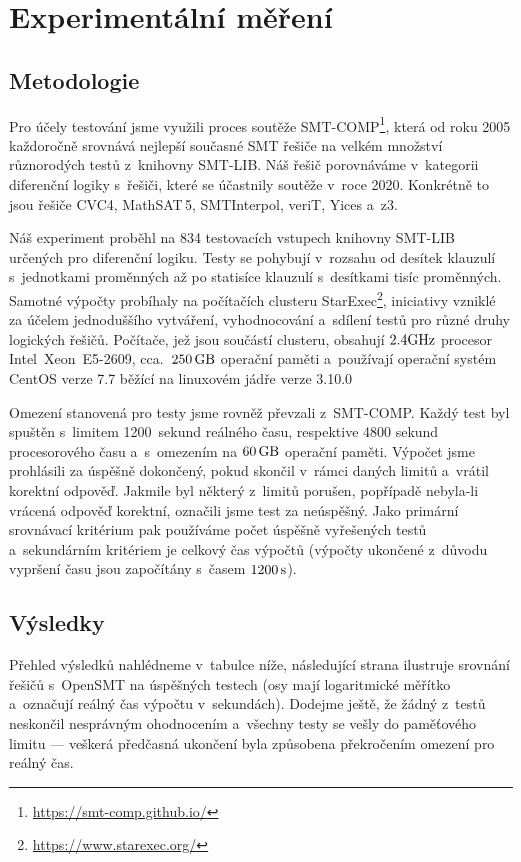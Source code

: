 \chapter{Experimentální měření}\label{experiment}

\section{Metodologie}

Pro účely testování jsme využili proces soutěže SMT-COMP\footnote{\url{https://smt-comp.github.io/}}, která od roku 2005 každoročně srovnává nejlepší současné SMT řešiče na velkém množství různorodých testů z~knihovny SMT-LIB. Náš řešič porovnáváme v~kategorii diferenční logiky s~řešiči, které se účastnily soutěže v~roce 2020. Konkrétně to jsou řešiče CVC4, MathSAT\,5, SMTInterpol, veriT, Yices a~z3.

Náš experiment proběhl na 834 testovacích vstupech knihovny SMT-LIB určených pro diferenční logiku. Testy se pohybují v~rozsahu od desítek klauzulí s~jednotkami proměnných až po statisíce klauzulí s~desítkami tisíc proměnných. Samotné výpočty probíhaly na počítačích clusteru StarExec\footnote{\url{https://www.starexec.org/}}, iniciativy vzniklé za účelem jednoduššího vytváření, vyhodnocování a~sdílení testů pro různé druhy logických řešičů. Počítače, jež jsou součástí clusteru, obsahují $2.4\rm GHz$ procesor Intel\textregistered\ Xeon\textregistered\ E5-2609, cca.~$250\,\rm GB$ operační paměti a~používají operační systém CentOS verze 7.7 běžící na linuxovém jádře verze 3.10.0

Omezení stanovená pro testy jsme rovněž převzali z~SMT-COMP. Každý test byl spuštěn s~limitem 1200~sekund reálného času, respektive 4800 sekund procesorového času a~s~omezením na $60\,\rm GB$ operační paměti. Výpočet jsme prohlásili za úspěšně dokončený, pokud skončil v~rámci daných limitů a~vrátil korektní odpověď. Jakmile byl některý z~limitů porušen, popřípadě nebyla-li vrácená odpověď korektní, označili jsme test za neúspěšný. Jako primární srovnávací kritérium pak používáme počet úspěšně vyřešených testů a~sekundárním kritériem je celkový čas výpočtů (výpočty ukončené z~důvodu vypršení času jsou započítány s~časem $1200\,\rm s$).

\section{Výsledky}

Přehled výsledků nahlédneme v~tabulce níže, následující strana ilustruje srovnání řešičů s~OpenSMT na úspěšných testech (osy mají logaritmické měřítko a~označují reálný čas výpočtu v~sekundách). Dodejme ještě, že žádný z~testů neskončil nesprávným ohodnocením a~všechny testy se vešly do paměťového limitu --- veškerá předčasná ukončení byla způsobena překročením omezení pro reálný čas.

